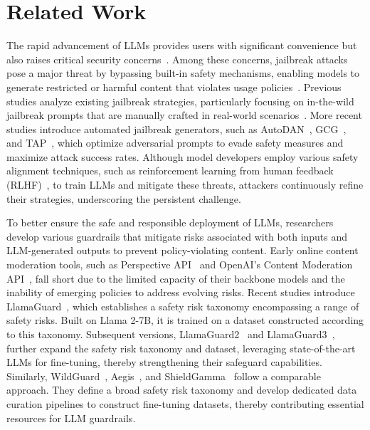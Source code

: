 \section{Related Work}

The rapid advancement of LLMs provides users with significant convenience but also raises critical security concerns~\cite{ZYPDLWW24,GRLWCWDW23,ZLWJZBSZ24,WLBZ24,LGFXS23}.
Among these concerns, jailbreak attacks pose a major threat by bypassing built-in safety mechanisms, enabling models to generate restricted or harmful content that violates usage policies~\cite{Google_Policy,Meta_Policy,OpenAI_Policy,Amazon_Policy_1}.
Previous studies analyze existing jailbreak strategies, particularly focusing on in-the-wild jailbreak prompts that are manually crafted in real-world scenarios~\cite{SCBSZ24}.
More recent studies introduce automated jailbreak generators, such as AutoDAN~\cite{LXCX23}, GCG~\cite{ZWKF23}, and TAP~\cite{MZKNASK23}, which optimize adversarial prompts to evade safety measures and maximize attack success rates.
Although model developers employ various safety alignment techniques, such as reinforcement learning from human feedback (RLHF)~\cite{LNTYCWZZ24,JLDPZBCSWY23}, to train LLMs and mitigate these threats, attackers continuously refine their strategies, underscoring the persistent challenge.

To better ensure the safe and responsible deployment of LLMs, researchers develop various guardrails that mitigate risks associated with both inputs and LLM-generated outputs to prevent policy-violating content.
Early online content moderation tools, such as Perspective API~\cite{Perspective} and OpenAI's Content Moderation API~\cite{OpenAI_Moderation}, fall short due to the limited capacity of their backbone models and the inability of emerging policies to address evolving risks.
Recent studies introduce LlamaGuard~\cite{IUCRIMTHFTK23}, which establishes a safety risk taxonomy encompassing a range of safety risks.
Built on Llama 2-7B, it is trained on a dataset constructed according to this taxonomy.
Subsequent versions, LlamaGuard2~\cite{Llama_Guard_2} and LlamaGuard3~\cite{CKZSRZPCUP24}, further expand the safety risk taxonomy and dataset, leveraging state-of-the-art LLMs for fine-tuning, thereby strengthening their safeguard capabilities.
Similarly, WildGuard~\cite{HREJLLCD24}, Aegis~\cite{GVGP24}, and ShieldGamma~\cite{ZLMPFHNPKRSW24} follow a comparable approach.
They define a broad safety risk taxonomy and develop dedicated data curation pipelines to construct fine-tuning datasets, thereby contributing essential resources for LLM guardrails.

